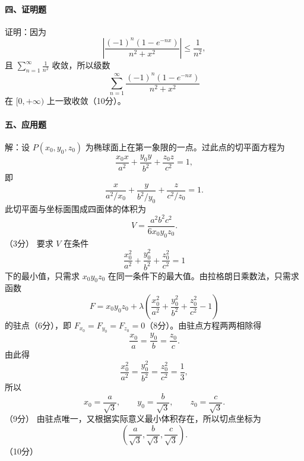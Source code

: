 \paragraph*{四、证明题}
证明：因为
\[
  \left|\frac{(-1)^n(1-e^{-nx})}{n^2+x^2}\right|\le \frac{1}{n^2},
\]
且 $\displaystyle\sum_{n=1}^{\infty}\frac1{n^2}$ 收敛，所以级数
\[
  \sum_{n=1}^{\infty}\frac{(-1)^n(1-e^{-nx})}{n^2+x^2}
\]
在 $[0,+\infty)$ 上一致收敛（10分）。

\paragraph*{五、应用题}
解：设 $P(x_0,y_0,z_0)$ 为椭球面上在第一象限的一点。过此点的切平面方程为
\[
  \frac{x_0x}{a^2}+\frac{y_0y}{b^2}+\frac{z_0z}{c^2}=1,
\]
即
\[
  \frac{x}{a^2/x_0}+\frac{y}{b^2/y_0}+\frac{z}{c^2/z_0}=1.
\]
此切平面与坐标面围成四面体的体积为
\[
  V=\frac{a^2b^2c^2}{6x_0y_0z_0}.
\]
（3分）
要求 $V$ 在条件
\[
  \frac{x_0^2}{a^2}+\frac{y_0^2}{b^2}+\frac{z_0^2}{c^2}=1
\]
下的最小值，只需求 $x_0y_0z_0$ 在同一条件下的最大值。由拉格朗日乘数法，只需求函数
\[
  F=x_0y_0z_0+\lambda\left(\frac{x_0^2}{a^2}
  +\frac{y_0^2}{b^2}+\frac{z_0^2}{c^2}-1\right)
\]
的驻点（6分），即 $F_{x_0}=F_{y_0}=F_{z_0}=0$（8分）。由驻点方程两两相除得
\[
  \frac{x_0}{a}=\frac{y_0}{b}=\frac{z_0}{c}.
\]
由此得
\[
  \frac{x_0^2}{a^2}=\frac{y_0^2}{b^2}=\frac{z_0^2}{c^2}=\frac13,
\]
所以
\[
  x_0=\frac{a}{\sqrt3},\qquad
  y_0=\frac{b}{\sqrt3},\qquad
  z_0=\frac{c}{\sqrt3}.
\]
（9分）
由驻点唯一，又根据实际意义最小体积存在，所以切点坐标为
\[
  \left(\frac{a}{\sqrt3},\frac{b}{\sqrt3},\frac{c}{\sqrt3}\right).
\]
（10分）
